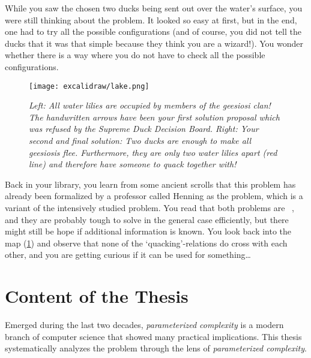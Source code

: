 While you saw the chosen two ducks being sent out over the water's surface, you were still thinking about the problem.
It looked so easy at first, but in the end, one had to try all the possible configurations (and of course, you did not tell the ducks that it was that simple because they think you are a wizard!).
You wonder whether there is a way where you do not have to check all the possible configurations.

\begin{figure}[t]
    \centering
    \texttt{[image: excalidraw/lake.png]}
    \caption[Introductions: Merganser Lake. Own Drawing. Embedded icons under public domain from {\href{https://creazilla.com/}{https://creazilla.com/}}]{\textit{Left: All water lilies are occupied by members of the \textit{geesiosi} clan! The handwritten arrows have been your first solution proposal which was refused by the \textit{Supreme Duck Decision Board}.
    Right: Your second and final solution: Two ducks are enough to make all \textit{geesiosi}s flee. Furthermore, they are only two water lilies apart (red line) and therefore have someone to quack together with!}}
    \label{fig:duck-lake}
\end{figure}

Back in your library, you learn from some ancient scrolls that this problem has already been formalized by a professor called Henning \cite{Henning2019} as the \sdom problem, which is a variant of the intensively studied \dom problem. 
You read that both problems are \NPc~\cite{Garey1979,Henning2019}, and they are probably tough to solve in the general case efficiently, but there might still be hope if additional information is known. 
You look back into the map (\cref{fig:duck-lake}) and observe that none of the `quacking'-relations do cross with each other, and you are getting curious if it can be used for something\ldots

\section{Content of the Thesis}

Emerged during the last two decades, \textit{parameterized complexity} is a modern branch of computer science that showed many practical implications. 
This thesis systematically analyzes the \sdom problem through the lens of \textit{parameterized complexity}. 

